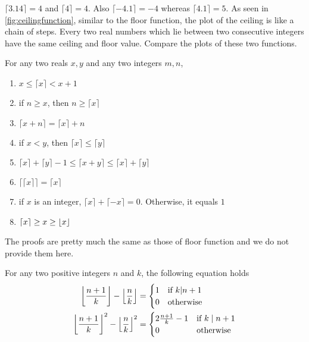 \begin{example}
$\lceil3.14\rceil=4$ and $\lceil4\rceil=4$. Also $\lceil-4.1\rceil=-4$ whereas $\lceil4.1\rceil=5$. As seen in \autoref{fig:ceilingfunction}, similar to the floor function, the plot of the ceiling is like a chain of steps. Every two real numbers which lie between two consecutive integers have the same ceiling and floor value. Compare the plots of these two functions.
\end{example}

\begin{proposition} \label{prop:ceiling}
For any two reals $x, y$ and any two integers $m,n$,
\begin{enumerate}[1.]
	\item $x\leq \lceil x\rceil < x+1$
	\item if $n \geq x$, then $n \geq \lceil x \rceil$
	\item $\lceil x+n\rceil=\lceil x\rceil+n$
	\item if $x <y$, then $\lceil x \rceil \leq \lceil y \rceil$
	\item $\lceil x\rceil+\lceil y \rceil - 1 \leq \lceil x+y\rceil \leq \lceil x\rceil+\lceil y\rceil$
	\item $\lceil \lceil x\rceil\rceil  =  \lceil x\rceil$
	\item if $x$ is an integer, $\lceil x\rceil+\lceil -x\rceil=0$. Otherwise, it equals $1$
	\item $\lceil x \rceil \geq x \geq \left\lfloor{x}\right\rfloor$
\end{enumerate}
\end{proposition}

The proofs are pretty much the same as those of floor function and we do not provide them here.

\begin{theorem}\label{thm:floor-k|n+1}
For any two positive integers $n$ and $k$, the following equation holds
\begin{align*}
	\left\lfloor{\frac{n+1}{k}}\right\rfloor- \left\lfloor{\frac{n}{k}}\right\rfloor &=
	\begin{cases}
		1&\mbox{if }k|n+1\\
		0&\mbox{otherwise}
	\end{cases}\\
	\left\lfloor{\frac{n+1}{k}}\right\rfloor^2 - \left\lfloor{\frac{n}{k}}\right\rfloor^2 &=
	\begin{cases}
		2\frac{n+1}{k}-1&\mbox{if }k\mid n+1\\
		0&\mbox{otherwise}
	\end{cases}
\end{align*}
\end{theorem}

